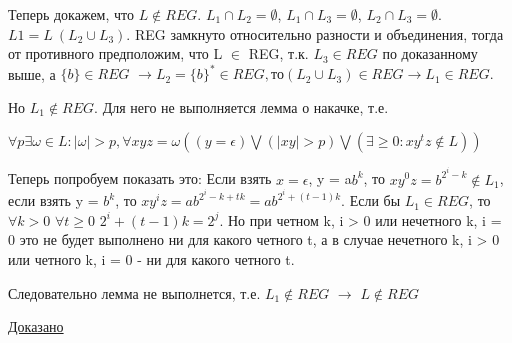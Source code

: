 \documentclass[a4paper,14pt]{article} %
\begin{document}
Теперь докажем, что $L \notin REG$.
$L_1 \cap L_2 = \emptyset$, $L_1 \cap L_3 = \emptyset$, $L_2 \cap L_3 = \emptyset$.
$L1 = L \ (L_2 \cup L_3)$.
REG замкнуто относительно разности и объединения, тогда от противного предположим, что L $\in$ REG, т.к. $L_3 \in REG$ по доказанному выше, а $\{b\} \in REG$ 
$\rightarrow L_2 = \{b\}^* \in REG, то (L_2 \cup L_3) \in REG \rightarrow L_1 \in REG.$

Но $L_1 \notin REG$.
Для него не выполняется лемма о накачке, т.е. 

$\forall p \exists \omega \in L : |\omega| > p, \forall xyz = \omega ((y = \epsilon) \bigvee (|xy| > p) \bigvee (\exists \geqslant 0 : xy^tz \notin L)) $

Теперь попробуем показать это:
Если взять $x = \epsilon$, y = a$b^k$, то $xy^0z = b^{2^i - k} \notin L_1$, если взять y = $b^k$, то $xy^iz = ab^{2^i - k + tk} = ab^{2^i + (t-1)k}$.
Если бы $L_1 \in REG$, то $\forall k > 0$ $\forall t \geqslant 0$ $2^i + (t-1)k = 2^j$. Но при четном k, i > 0 или нечетного k, i = 0 это не будет выполнено ни для какого четного t, а в случае нечетного k, i > 0 или четного k, i = 0 - ни для какого четного t.

Следовательно лемма не выполнется, т.е. $L_1 \notin REG$ $\rightarrow$ $L \notin REG$

\underline{Доказано}
\end{document}
